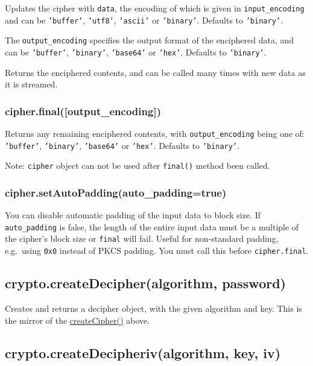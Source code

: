 Updates the cipher with \texttt{data}, the encoding of which is given in
\texttt{input\_encoding} and can be \texttt{'buffer'}, \texttt{'utf8'},
\texttt{'ascii'} or \texttt{'binary'}. Defaults to \texttt{'binary'}.

The \texttt{output\_encoding} specifies the output format of the
enciphered data, and can be \texttt{'buffer'}, \texttt{'binary'},
\texttt{'base64'} or \texttt{'hex'}. Defaults to \texttt{'binary'}.

Returns the enciphered contents, and can be called many times with new
data as it is streamed.

\subsubsection{cipher.final({[}output\_encoding{]})}

Returns any remaining enciphered contents, with
\texttt{output\_encoding} being one of: \texttt{'buffer'},
\texttt{'binary'}, \texttt{'base64'} or \texttt{'hex'}. Defaults to
\texttt{'binary'}.

Note: \texttt{cipher} object can not be used after \texttt{final()}
method been called.

\subsubsection{cipher.setAutoPadding(auto\_padding=true)}

You can disable automatic padding of the input data to block size. If
\texttt{auto\_padding} is false, the length of the entire input data
must be a multiple of the cipher's block size or \texttt{final} will
fail. Useful for non-standard padding, e.g.~using \texttt{0x0} instead
of PKCS padding. You must call this before \texttt{cipher.final}.

\subsection{crypto.createDecipher(algorithm, password)}

Creates and returns a decipher object, with the given algorithm and key.
This is the mirror of the
\hyperref[crypto\_crypto\_createcipher\_algorithm\_password]{createCipher()}
above.

\subsection{crypto.createDecipheriv(algorithm, key, iv)}


